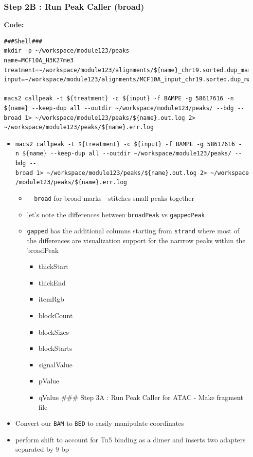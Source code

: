 \documentclass[
]{book}
\providecommand{\tightlist}{%
  \setlength{\itemsep}{0pt}\setlength{\parskip}{0pt}}
\begin{document}
\subsubsection{Step 2B : Run Peak Caller (broad)}\label{step-2b-run-peak-caller-broad}

\textbf{Code:}

\begin{verbatim}
###Shell###
mkdir -p ~/workspace/module123/peaks
name=MCF10A_H3K27me3
treatment=~/workspace/module123/alignments/${name}_chr19.sorted.dup_marked.dedup.bam
input=~/workspace/module123/alignments/MCF10A_input_chr19.sorted.dup_marked.dedup.bam

macs2 callpeak -t ${treatment} -c ${input} -f BAMPE -g 58617616 -n ${name} --keep-dup all --outdir ~/workspace/module123/peaks/ --bdg --broad 1> ~/workspace/module123/peaks/${name}.out.log 2> ~/workspace/module123/peaks/${name}.err.log
\end{verbatim}

\begin{itemize}
\tightlist
\item
  \texttt{macs2\ callpeak\ -t\ \$\{treatment\}\ -c\ \$\{input\}\ -f\ BAMPE\ -g\ 58617616\ -n\ \$\{name\}\ -\/-keep-dup\ all\ -\/-outdir\ \textasciitilde{}/workspace/module123/peaks/\ -\/-bdg\ -\/-broad\ 1\textgreater{}\ \textasciitilde{}/workspace/module123/peaks/\$\{name\}.out.log\ 2\textgreater{}\ \textasciitilde{}/workspace/module123/peaks/\$\{name\}.err.log}

  \begin{itemize}
  \tightlist
  \item
    \texttt{-\/-broad} for broad marks - stitches small peaks together
  \item
    let's note the differences between \texttt{broadPeak} vs \texttt{gappedPeak}
  \item
    \texttt{gapped} has the additional columns starting from \texttt{strand} where most of the differences are visualization support for the narrrow peaks within the broadPeak

    \begin{itemize}
    \tightlist
    \item
      thickStart
    \item
      thickEnd
    \item
      itemRgb
    \item
      blockCount
    \item
      blockSizes
    \item
      blockStarts
    \item
      signalValue
    \item
      pValue
    \item
      qValue
      \#\#\# Step 3A : Run Peak Caller for ATAC - Make fragment file
    \end{itemize}
  \end{itemize}
\item
  Convert our \texttt{BAM} to \texttt{BED} to easily manipulate coordinates
\item
  perform shift to account for Tn5 binding as a dimer and inserts two adapters separated by 9 bp
\end{itemize}
\end{document}

